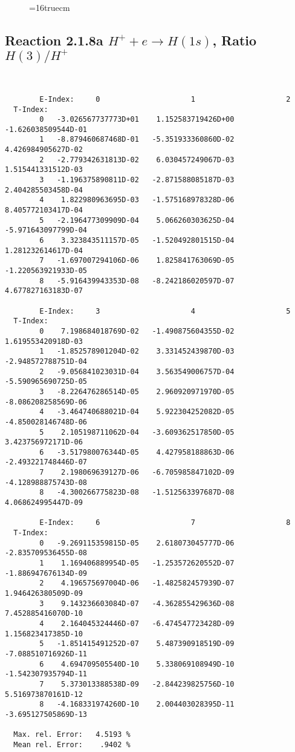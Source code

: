 \documentclass[12pt,dvipdfmx]{article}
\begin{document}
\begin{figure} \label{2.1.8_equil}
\epsfxsize=16truecm
\end{figure}
\newpage


\subsection{
Reaction 2.1.8a  $H^+ + e \rightarrow H(1s) $,  Ratio $H(3)/H^+$
}

\begin{small}\begin{verbatim}


        E-Index:     0                     1                     2
  T-Index:
        0   -3.026567737773D+01    1.152583719426D+00   -1.626038509544D-01
        1   -8.879460687468D-01   -5.351933360860D-02    4.426984905627D-02
        2   -2.779342631813D-02    6.030457249067D-03    1.515441331512D-03
        3   -1.196375890811D-02   -2.871588085187D-03    2.404285503458D-04
        4    1.822980963695D-03   -1.575168978328D-06    8.405772103417D-04
        5   -2.196477309909D-04    5.066260303625D-04   -5.971643097799D-04
        6    3.323843511157D-05   -1.520492801515D-04    1.281232614617D-04
        7   -1.697007294106D-06    1.825841763069D-05   -1.220563921933D-05
        8   -5.916439943353D-08   -8.242186020597D-07    4.677827163183D-07

        E-Index:     3                     4                     5
  T-Index:
        0    7.198684018769D-02   -1.490875604355D-02    1.619553420918D-03
        1   -1.852578901204D-02    3.331452439870D-03   -2.948572788751D-04
        2   -9.056841023031D-04    3.563549006757D-04   -5.590965690725D-05
        3   -8.226476286514D-05    2.960920971970D-05   -8.086208258569D-06
        4   -3.464740688021D-04    5.922304252082D-05   -4.850028146748D-06
        5    2.105198711062D-04   -3.609362517850D-05    3.423756972171D-06
        6   -3.517980076344D-05    4.427958188863D-06   -2.493221748446D-07
        7    2.198069639127D-06   -6.705985847102D-09   -4.128988875743D-08
        8   -4.300266775823D-08   -1.512563397687D-08    4.068624995447D-09

        E-Index:     6                     7                     8
  T-Index:
        0   -9.269115359815D-05    2.618073045777D-06   -2.835709536455D-08
        1    1.169406889954D-05   -1.253572620552D-07   -1.886947676134D-09
        2    4.196575697004D-06   -1.482582457939D-07    1.946426380509D-09
        3    9.143236603084D-07   -4.362855429636D-08    7.452885416070D-10
        4    2.164045324446D-07   -6.474547723428D-09    1.156823417385D-10
        5   -1.851415491252D-07    5.487390918519D-09   -7.088510716926D-11
        6    4.694709505540D-10    5.338069108949D-10   -1.542307935794D-11
        7    5.373013388538D-09   -2.844239825756D-10    5.516973870161D-12
        8   -4.168331974260D-10    2.004403028395D-11   -3.695127505869D-13

  Max. rel. Error:   4.5193 %
  Mean rel. Error:    .9402 %

\end{verbatim}\end{small}
\end{document}
